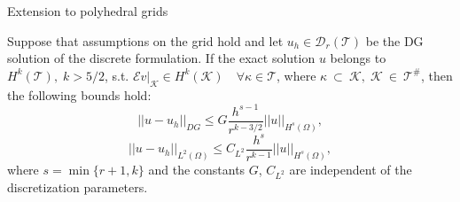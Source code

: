 \documentclass{beamer}
\begin{document}
\begin{frame}{Extension to polyhedral grids}
	\begin{theorem}
		Suppose that assumptions on the grid hold and let
		$u_h \in \mathcal{D}_r(\mathcal{T})$ be the DG solution of
		the discrete formulation. If the exact solution $u$ belongs to
		$H^k(\mathcal{T}), \; k>5/2$, s.t.
		$\mathcal{E}v|_\mathcal{K}\in H^k(\mathcal{K}) \quad \forall
		\kappa\in\mathcal{T}$, where $\kappa~\subset~\mathcal{K}, \;
		\mathcal{K}~\in~\mathcal{T}^\#$, then the following bounds hold:
		\begin{equation*}
			|\!|u-u_h|\!|_{DG} \leq G \frac{h^{s-1}}{r^{k-3/2}}
			|\!|u|\!|_{H^s(\Omega)},
		\end{equation*}
		\begin{equation*}
		|\!|u-u_h|\!|_{L^2(\Omega)} \leq C_{L^2} \frac{h^s}{r^{k-1}}
		|\!|u|\!|_{H^s(\Omega)},
		\end{equation*}
		where $s = \min \{r+1, k\}$ and the constants $G$, $C_{L^2}$ are
		independent of the discretization parameters.
	\end{theorem}
\end{frame}
\end{document}
